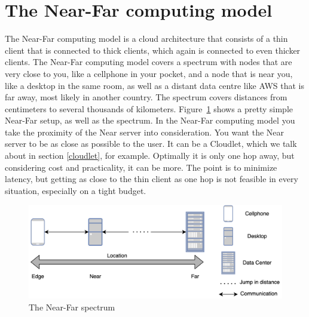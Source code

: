 \section{The Near-Far computing model}
The Near-Far computing model is a cloud architecture that consists of a thin client that is connected to thick clients, which again is connected to even thicker clients. The Near-Far computing model covers a spectrum with nodes that are very close to you, like a cellphone in your pocket, and a node that is near you, like a desktop in the same room, as well as a distant data centre like AWS that is far away, most likely in another country. The spectrum covers distances from centimeters to several thousands of kilometers. Figure~\ref{fig:nearFarSimple} shows a pretty simple Near-Far setup, as well as the spectrum. In the Near-Far computing model you take the proximity of the Near server into consideration. You want the Near server to be as close as possible to the user. It can be a Cloudlet, which we talk about in section \ref{cloudlet}, for example. Optimally it is only one hop away, but considering cost and practicality, it can be more. The point is to minimize latency, but getting as close to the thin client as one hop is not feasible in every situation, especially on a tight budget.

\begin{figure}[t]
    \centering
    \includegraphics[scale=0.7]{chapters/background/figures/near-far-diagram.png}
    \caption{The Near-Far spectrum}
    \label{fig:nearFarSimple}
\end{figure}


